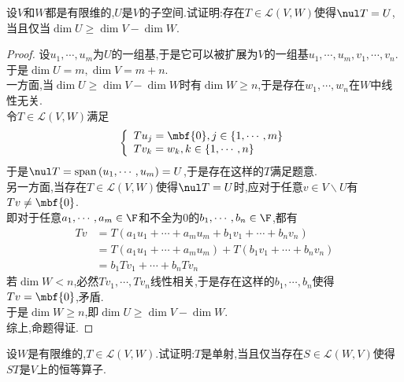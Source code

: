 \documentclass{ctexart}
\begin{document}
\begin{problem}[18.]
    设$V$和$W$都是有限维的,$U$是$V$的子空间.试证明:存在$T\in\mathcal{L}(V,W)$使得$\nul T=U$,当且仅当$\dim U\geqslant\dim V-\dim W$.
\end{problem}
\begin{proof}
    设$u_1,\cdots,u_m$为$U$的一组基,于是它可以被扩展为$V$的一组基$u_1,\cdots,u_m,v_1,\cdots,v_n$.\\
    于是$\dim U=m,\dim V=m+n$.\\
    一方面,当$\dim U\geqslant\dim V-\dim W$时有$\dim W\geqslant n$,于是存在$w_1,\cdots,w_n$在$W$中线性无关.\\
    令$T\in\mathcal{L}(V,W)$满足
    $$\left\{\begin{array}{l}
        Tu_j=\mbf{0},j\in\left\{1,\cdots,m\right\}\\
        Tv_k=w_k,k\in\left\{1,\cdots,n\right\}
    \end{array}\right.$$
    于是$\nul T=\text{span}\left(u_1,\cdots,u_m\right)=U$,于是存在这样的$T$满足题意.\\
    另一方面,当存在$T\in\mathcal{L}(V,W)$使得$\nul T=U$时,应对于任意$v\in V\backslash U$有$Tv\neq\mbf{0}$.\\
    即对于任意$a_1,\cdots,a_m\in\F$和不全为$0$的$b_1,\cdots,b_n\in\F$,都有
    $$\begin{aligned}
        Tv
        &= T\left(a_1u_1+\cdots+a_mu_m+b_1v_1+\cdots+b_nv_n\right) \\
        &= T\left(a_1u_1+\cdots+a_mu_m\right)+T\left(b_1v_1+\cdots+b_nv_n\right) \\
        &= b_1Tv_1+\cdots+b_nTv_n
    \end{aligned}$$
    若$\dim W<n$,必然$Tv_1,\cdots,Tv_n$线性相关,于是存在这样的$b_1,\cdots,b_n$使得$Tv=\mbf{0}$,矛盾.\\
    于是$\dim W\geqslant n$,即$\dim U\geqslant\dim V-\dim W$.\\
    综上,命题得证.
\end{proof}
\begin{problem}[19.]
    设$W$是有限维的,$T\in\mathcal{L}(V,W)$.试证明:$T$是单射,当且仅当存在$S\in\mathcal{L}(W,V)$使得$ST$是$V$上的恒等算子.
\end{problem}
\end{document}
